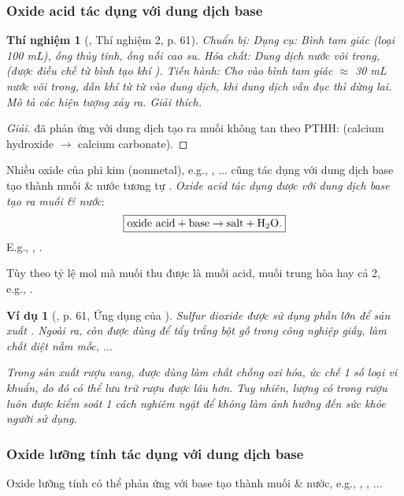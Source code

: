 \documentclass{article}
\newtheorem{thinghiem}{Thí nghiệm}
\newtheorem{vidu}{Ví dụ}
\begin{document}
\subsubsection{Oxide acid tác dụng với dung dịch base}

\begin{thinghiem}[\cite{SGK_KHTN_8_Canh_Dieu}, Thí nghiệm 2, p. 61]
	{\rm Chuẩn bị:} Dụng cụ: Bình tam giác (loại {\rm100 mL}), ống thủy tinh, ống nối cao su. Hóa chất: Dung dịch nước vôi trong, {\rm{}} (được điều chế từ bình tạo khí {\rm{}}). {\rm Tiến hành:} Cho vào bình tam giác $\approx$ {\rm30 mL} nước vôi trong, dẫn khí {\rm{}} từ từ vào dung dịch, khi dung dịch vẫn đục thì dừng lai. Mô tả các hiện tượng xảy ra. Giải thích.
\end{thinghiem}

\begin{proof}[Giải]
	 đã phản ứng với dung dịch  tạo ra muối  không tan theo PTHH:  (calcium hydroxide $\to$ calcium carbonate).
\end{proof}
Nhiều oxide của phi kim (nonmetal), e.g., , $\ldots$ cũng tác dụng với dung dịch base tạo thành muối \& nước tương tự . \textit{Oxide acid tác dụng được với dung dịch base tạo ra muối \& nước}:
\begin{align*}
	\boxed{\mbox{oxide acid} + \mbox{base}\to\mbox{salt} + \ce{H2O}.}
\end{align*}
E.g., , .

Tùy theo tỷ lệ mol mà muối thu được là muối acid, muối trung hòa hay cả 2, e.g., .

\begin{vidu}[\cite{SGK_KHTN_8_Canh_Dieu}, p. 61, Ứng dụng của ]
	Sulfur dioxide {\rm{}} được sử dụng phần lớn để sản xuất {\rm{}}. Ngoài ra, {\rm{}} còn được dùng để tẩy trắng bột gỗ trong công nghiệp giấy, làm chất diệt nấm mốc, $\ldots$
	
	Trong sản xuất rượu vang, {\rm{}} được dùng làm chất chống oxi hóa, ức chế 1 số loại vi khuẩn, do đó có thể lưu trữ rượu được lâu hơn. Tuy nhiên, lượng {\rm{}} có trong rượu luôn được kiểm soát 1 cách nghiêm ngặt để không làm ảnh hưởng đến sức khỏe người sử dụng.
\end{vidu}

\subsubsection{Oxide lưỡng tính tác dụng với dung dịch base}
Oxide lưỡng tính có thể phản ứng với base tạo thành muối \& nước, e.g., , , $\ldots$
\end{document}
